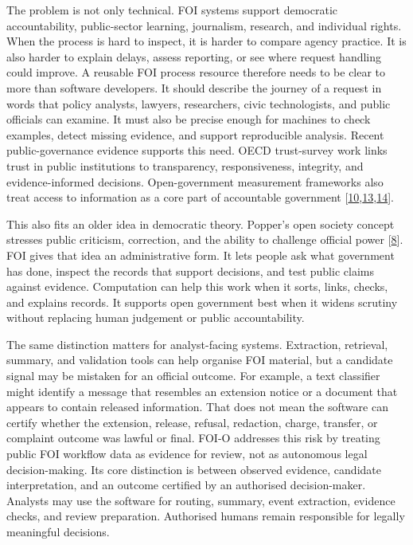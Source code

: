 \documentclass[
]{article}
\begin{document}
The problem is not only technical. FOI systems support democratic
accountability, public-sector learning, journalism, research, and
individual rights. When the process is hard to inspect, it is harder to
compare agency practice. It is also harder to explain delays, assess
reporting, or see where request handling could improve. A reusable FOI
process resource therefore needs to be clear to more than software
developers. It should describe the journey of a request in words that
policy analysts, lawyers, researchers, civic technologists, and public
officials can examine. It must also be precise enough for machines to
check examples, detect missing evidence, and support reproducible
analysis. Recent public-governance evidence supports this need. OECD
trust-survey work links trust in public institutions to transparency,
responsiveness, integrity, and evidence-informed decisions.
Open-government measurement frameworks also treat access to information
as a core part of accountable government {[}\hyperlink{ref-10}{10},\hyperlink{ref-13}{13},\hyperlink{ref-14}{14}{]}.

This also fits an older idea in democratic theory. Popper's open society
concept stresses public criticism, correction, and the ability to
challenge official power {[}\hyperlink{ref-8}{8}{]}. FOI gives that idea an administrative
form. It lets people ask what government has done, inspect the records
that support decisions, and test public claims against evidence.
Computation can help this work when it sorts, links, checks, and
explains records. It supports open government best when it widens
scrutiny without replacing human judgement or public accountability.

The same distinction matters for analyst-facing systems. Extraction,
retrieval, summary, and validation tools can help organise FOI material,
but a candidate signal may be mistaken for an official outcome. For
example, a text classifier might identify a message that resembles an
extension notice or a document that appears to contain released
information. That does not mean the software can certify whether the
extension, release, refusal, redaction, charge, transfer, or complaint
outcome was lawful or final. FOI-O addresses this risk by treating
public FOI workflow data as evidence for review, not as autonomous legal
decision-making. Its core distinction is between observed evidence,
candidate interpretation, and an outcome certified by an authorised
decision-maker. Analysts may use the software for routing, summary,
event extraction, evidence checks, and review preparation. Authorised
humans remain responsible for legally meaningful decisions.
\end{document}
